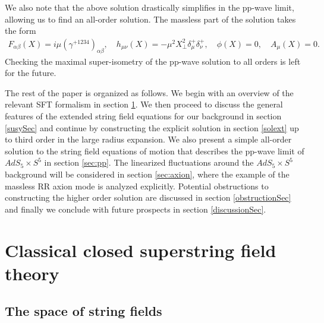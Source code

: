 \documentclass[12pt]{article}
\def\be{\begin{equation}}
\def\ee{\end{equation}}
\numberwithin{equation}{section}
\begin{document}
We also note that the above solution drastically simplifies in the pp-wave limit, allowing us to find an all-order solution. The  massless part of the solution takes the form
\be
\begin{aligned}
F_{\alpha \beta}(X)= i \mu (\gamma^{+1234})_{\alpha \beta}, \quad h_{\mu \nu}(X) =  - \mu^2 X_\perp^2 \delta_\mu^+ \delta_\nu^+ , \quad \phi(X) =  0, \quad A_\mu(X) = 0.
\end{aligned}
\ee
Checking the maximal super-isometry of the pp-wave solution to all orders is left for the future.


The rest of the paper is organized as follows. We begin with an overview of the relevant SFT formalism in section \ref{sftSec}. We then proceed to discuss the general features of the extended string field equations for our background in section \ref{susySec} and continue by constructing the explicit solution in section \ref{solext} up to third order in the large radius expansion. We also present a simple all-order solution to the string field equations of motion that describes the pp-wave limit of $AdS_5\times S^5$ in section \ref{sec:pp}. The linearized fluctuations around the $AdS_5\times S^5$ background will be considered in section \ref{sec:axion}, where the example of the massless RR axion mode is analyzed explicitly. Potential obstructions to constructing the higher order solution are discussed in section \ref{obstructionSec} and finally we conclude with future prospects in section \ref{discussionSec}.


\section{Classical closed superstring field theory}
\label{sftSec}



\subsection{The space of string fields}
\end{document}
